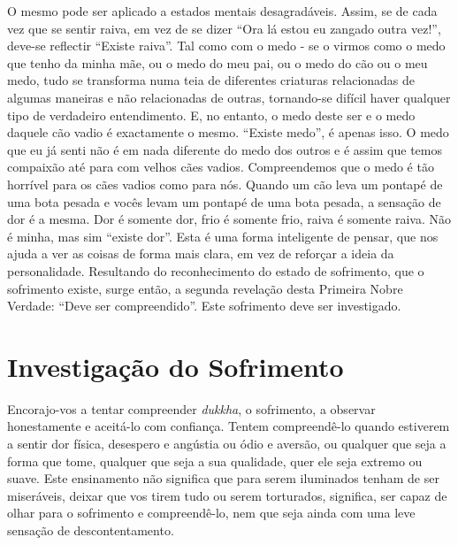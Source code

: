 O mesmo pode ser aplicado a estados mentais desagradáveis. Assim, se de cada vez
que se sentir raiva, em vez de se dizer “Ora lá estou eu zangado outra vez!”,
deve-se reflectir “Existe raiva”. Tal como com o medo - se o virmos como o medo
que tenho da minha mãe, ou o medo do meu pai, ou o medo do cão ou o meu medo,
tudo se transforma numa teia de diferentes criaturas relacionadas de algumas
maneiras e não relacionadas de outras, tornando-se difícil haver qualquer tipo
de verdadeiro entendimento. E, no entanto, o medo deste ser e o medo daquele cão
vadio é exactamente o mesmo. “Existe medo”, é apenas isso. O medo que eu já
senti não é em nada diferente do medo dos outros e é assim que temos compaixão
até para com velhos cães vadios. Compreendemos que o medo é tão horrível para os
cães vadios como para nós. Quando um cão leva um pontapé de uma bota pesada e
vocês levam um pontapé de uma bota pesada, a sensação de dor é a mesma. Dor é
somente dor, frio é somente frio, raiva é somente raiva. Não é minha, mas sim
“existe dor”. Esta é uma forma inteligente de pensar, que nos ajuda a ver as
coisas de forma mais clara, em vez de reforçar a ideia da personalidade.
Resultando do reconhecimento do estado de sofrimento, que o sofrimento existe,
surge então, a segunda revelação desta Primeira Nobre Verdade: “Deve ser
compreendido”. Este sofrimento deve ser investigado.

\section{Investigação do Sofrimento}

Encorajo-vos a tentar compreender \emph{dukkha}, o sofrimento, a observar
honestamente e aceitá-lo com confiança. Tentem compreendê-lo quando estiverem a
sentir dor física, desespero e angústia ou ódio e aversão, ou qualquer que seja
a forma que tome, qualquer que seja a sua qualidade, quer ele seja extremo ou
suave. Este ensinamento não significa que para serem iluminados tenham de ser
miseráveis, deixar que vos tirem tudo ou serem torturados, significa, ser capaz
de olhar para o sofrimento e compreendê-lo, nem que seja ainda com uma leve
sensação de descontentamento.

